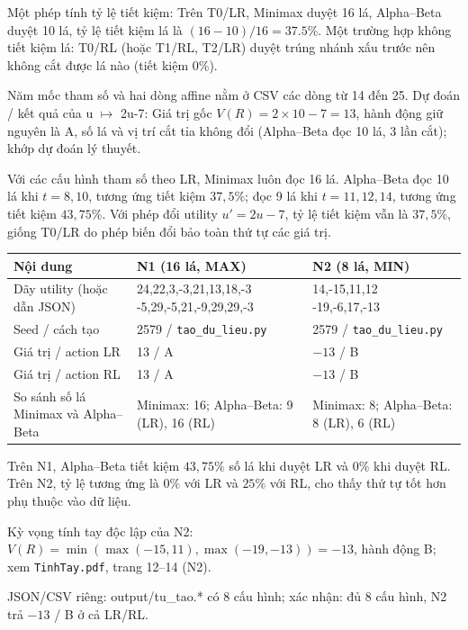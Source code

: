 \documentclass[11pt,a4paper]{article}
\newcommand{\head}[1]{\par\Needspace{3\baselineskip}\medskip{\large\sffamily\bfseries\color{Ink}#1}\par}
\begin{document}
Một phép tính tỷ lệ tiết kiệm: Trên T0/LR, Minimax duyệt 16 lá, Alpha--Beta duyệt 10 lá, tỷ lệ tiết kiệm lá là $(16-10)/16 = 37.5\%$. Một trường hợp không tiết kiệm lá: T0/RL (hoặc T1/RL, T2/LR) duyệt trúng nhánh xấu trước nên không cắt được lá nào (tiết kiệm 0\%).\par\medskip
Năm mốc tham số và hai dòng affine nằm ở CSV các dòng từ 14 đến 25. Dự đoán / kết quả của u $\mapsto$ 2u-7: Giá trị gốc $V(R) = 2 \times 10 - 7 = 13$, hành động giữ nguyên là A, số lá và vị trí cắt tỉa không đổi (Alpha--Beta đọc 10 lá, 3 lần cắt); khớp dự đoán lý thuyết.\par\medskip
Với các cấu hình tham số theo LR, Minimax luôn đọc 16 lá. Alpha--Beta đọc 10 lá khi $t=8,10$, tương ứng tiết kiệm $37{,}5\%$; đọc 9 lá khi $t=11,12,14$, tương ứng tiết kiệm $43{,}75\%$. Với phép đổi utility $u'=2u-7$, tỷ lệ tiết kiệm vẫn là $37{,}5\%$, giống T0/LR do phép biến đổi bảo toàn thứ tự các giá trị.\par\medskip
\head{7. Hai cây riêng N1/N2}
\begingroup\footnotesize\renewcommand{\arraystretch}{1.45}\begin{tabularx}{\linewidth}{XXX}\toprule
\textbf{Nội dung} & \textbf{N1 (16 lá, MAX)} & \textbf{N2 (8 lá, MIN)}\\\midrule
Dãy utility (hoặc dẫn JSON) & \shortstack[l]{24,22,3,-3,21,13,18,-3\\-5,29,-5,21,-9,29,29,-3} & \shortstack[l]{14,-15,11,12\\-19,-6,17,-13}\\
Seed / cách tạo & 2579 / \texttt{tao\_du\_lieu.py} & 2579 / \texttt{tao\_du\_lieu.py}\\
Giá trị / action LR & 13 / A & $-13$ / B\\
Giá trị / action RL & 13 / A & $-13$ / B\\
So sánh số lá Minimax và Alpha--Beta & Minimax: 16; Alpha--Beta: 9 (LR), 16 (RL) & Minimax: 8; Alpha--Beta: 8 (LR), 6 (RL)\\
\bottomrule\end{tabularx}\endgroup\par\medskip
Trên N1, Alpha--Beta tiết kiệm $43{,}75\%$ số lá khi duyệt LR và $0\%$ khi duyệt RL. Trên N2, tỷ lệ tương ứng là $0\%$ với LR và $25\%$ với RL, cho thấy thứ tự tốt hơn phụ thuộc vào dữ liệu.\par\medskip
Kỳ vọng tính tay độc lập của N2: $V(R)=\min(\max(-15,11),\max(-19,-13))=-13$, hành động B; xem \texttt{TinhTay.pdf}, trang 12--14 (N2).\par JSON/CSV riêng: output/tu\_tao.* có 8 cấu hình; xác nhận: đủ 8 cấu hình, N2 trả $-13$ / B ở cả LR/RL.\par\medskip
\end{document}

